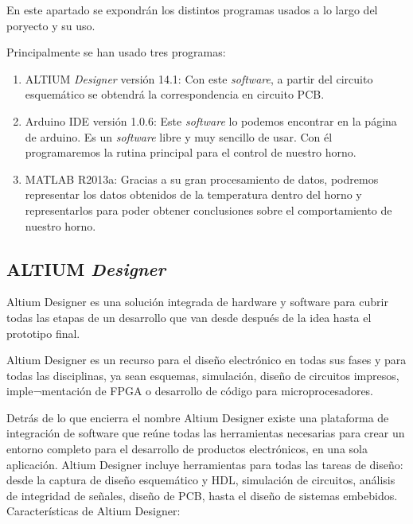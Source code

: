 En este apartado se expondrán los distintos programas usados a lo largo del poryecto y su uso.

Principalmente se han usado tres programas: 



\begin{enumerate}
	\item ALTIUM \textit{Designer} versión 14.1: Con este \textit{software}, a partir del circuito esquemático se obtendrá la correspondencia en circuito \acrshort{PCB}. 
	\item Arduino IDE versión 1.0.6: Este \textit{software} lo podemos encontrar en la página de arduino. Es un  \textit{software} libre y muy sencillo de usar. Con él programaremos la rutina principal para el control de nuestro horno.
	\item MATLAB R2013a: Gracias a su gran procesamiento de datos, podremos representar los datos obtenidos de la temperatura dentro del horno y representarlos para poder obtener conclusiones sobre el comportamiento de nuestro horno.
\end{enumerate}

\subsection{ALTIUM \textit{Designer}}
Altium Designer es una solución integrada de hardware y software para cubrir todas las etapas de un desarrollo que van desde después de la idea hasta el prototipo final.

Altium Designer es un recurso para el diseño electrónico en todas sus fases y para todas las disciplinas, ya sean esquemas, simulación, diseño de circuitos impresos, imple¬mentación de FPGA o desarrollo de código para microprocesadores.

 Detrás de lo que encierra el nombre Altium Designer existe una plataforma de integración de software que reúne todas las herramientas necesarias para crear un entorno completo para el desarrollo de productos electrónicos, en una sola aplicación. Altium Designer incluye herramientas para todas las tareas de diseño: desde la captura de diseño esquemático y HDL, simulación de circuitos, análisis de integridad de señales, diseño de \acrshort{PCB}, hasta el diseño de sistemas embebidos. Características de Altium Designer:

